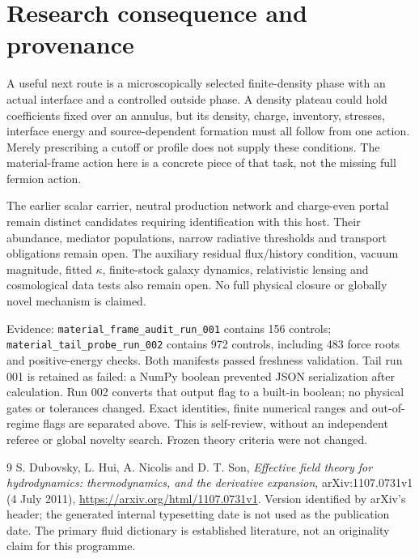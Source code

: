 \documentclass[11pt]{article}
\begin{document}
\section{Research consequence and provenance}
A useful next route is a microscopically selected finite-density phase
with an actual interface and a controlled outside phase. A density plateau
could hold coefficients fixed over an annulus, but its density, charge,
inventory, stresses, interface energy and source-dependent formation must
all follow from one action. Merely prescribing a cutoff or profile does
not supply these conditions. The material-frame action here is a concrete
piece of that task, not the missing full fermion action.

The earlier scalar carrier, neutral production network and charge-even
portal remain distinct candidates requiring identification with this
host. Their abundance, mediator populations, narrow radiative thresholds
and transport obligations remain open. The auxiliary residual flux/history
condition, vacuum magnitude, fitted $\kappa$, finite-stock galaxy dynamics,
relativistic lensing and cosmological data tests also remain open. No
full physical closure or globally novel mechanism is claimed.

Evidence: \texttt{material\_frame\_audit\_run\_001} contains 156 controls;
\texttt{material\_tail\_probe\_run\_002} contains 972 controls, including
483 force roots and positive-energy checks. Both manifests passed freshness
validation. Tail run 001 is retained as failed: a NumPy boolean prevented
JSON serialization after calculation. Run 002 converts that output flag
to a built-in boolean; no physical gates or tolerances changed. Exact
identities, finite numerical ranges and out-of-regime flags are separated
above. This is self-review, without an independent referee or global
novelty search. Frozen theory criteria were not changed.

\begin{thebibliography}{9}
 S. Dubovsky, L. Hui, A. Nicolis and D. T. Son,
\emph{Effective field theory for hydrodynamics: thermodynamics, and the
derivative expansion}, arXiv:1107.0731v1 (4 July 2011),
\url{https://arxiv.org/html/1107.0731v1}. Version identified by arXiv's
header; the generated internal typesetting date is not used as the
publication date. The primary fluid dictionary is established literature,
not an originality claim for this programme.
\end{thebibliography}

\clearpage
\end{document}
